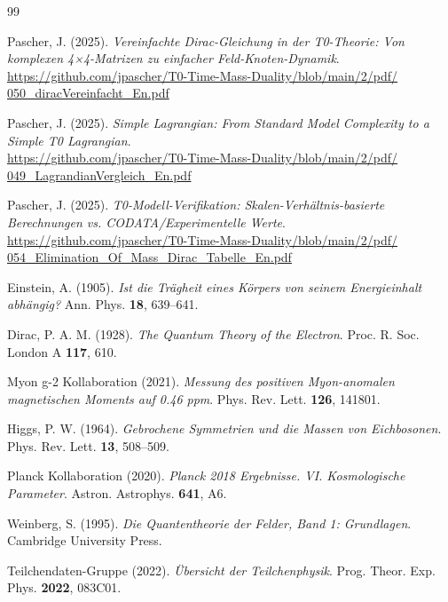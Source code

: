 \begin{thebibliography}{99}

Pascher, J. (2025). \textit{Vereinfachte Dirac-Gleichung in der T0-Theorie: Von komplexen 4×4-Matrizen zu einfacher Feld-Knoten-Dynamik}. \\
\href{https://github.com/jpascher/T0-Time-Mass-Duality/blob/main/2/pdf/050_diracVereinfacht_En.pdf}{https://github.com/jpascher/T0-Time-Mass-Duality/blob/main/2/pdf/\\050\_diracVereinfacht\_En.pdf}

Pascher, J. (2025). \textit{Simple Lagrangian: From Standard Model Complexity to a Simple T0 Lagrangian}. \\
\href{https://github.com/jpascher/T0-Time-Mass-Duality/blob/main/2/pdf/049_LagrandianVergleich_En.pdf}{https://github.com/jpascher/T0-Time-Mass-Duality/blob/main/2/pdf/\\049\_LagrandianVergleich\_En.pdf}

Pascher, J. (2025). \textit{T0-Modell-Verifikation: Skalen-Verhältnis-basierte Berechnungen vs. CODATA/Experimentelle Werte}. \\
\href{https://github.com/jpascher/T0-Time-Mass-Duality/blob/main/2/pdf/054_Elimination_Of_Mass_Dirac_Tabelle_En.pdf}{https://github.com/jpascher/T0-Time-Mass-Duality/blob/main/2/pdf/\\054\_Elimination\_Of\_Mass\_Dirac\_Tabelle\_En.pdf}

Einstein, A. (1905). \textit{Ist die Trägheit eines Körpers von seinem Energieinhalt abhängig?} Ann. Phys. \textbf{18}, 639--641.

Dirac, P. A. M. (1928). \textit{The Quantum Theory of the Electron}. Proc. R. Soc. London A \textbf{117}, 610.

Myon g-2 Kollaboration (2021). \textit{Messung des positiven Myon-anomalen magnetischen Moments auf 0.46 ppm}. Phys. Rev. Lett. \textbf{126}, 141801.

Higgs, P. W. (1964). \textit{Gebrochene Symmetrien und die Massen von Eichbosonen}. Phys. Rev. Lett. \textbf{13}, 508--509.

Planck Kollaboration (2020). \textit{Planck 2018 Ergebnisse. VI. Kosmologische Parameter}. Astron. Astrophys. \textbf{641}, A6.

Weinberg, S. (1995). \textit{Die Quantentheorie der Felder, Band 1: Grundlagen}. Cambridge University Press.

Teilchendaten-Gruppe (2022). \textit{Übersicht der Teilchenphysik}. Prog. Theor. Exp. Phys. \textbf{2022}, 083C01.

\end{thebibliography}
	